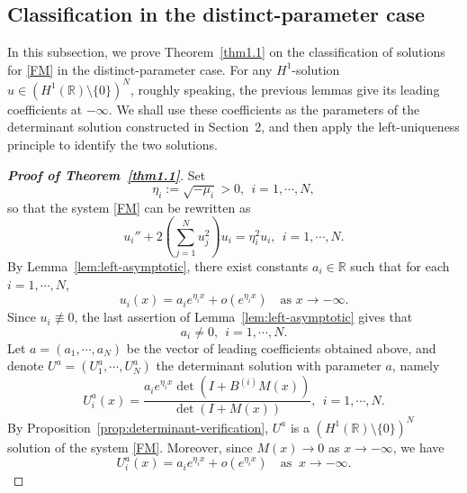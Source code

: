 \documentclass[11pt]{article}
\numberwithin{equation}{section}
\newcommand{\R}{{\mathbb{R}}}
\theoremstyle{definition}
\begin{document}
\subsection{Classification in the distinct-parameter case}
In this subsection, we prove   Theorem~\ref{thm1.1} on the classification of solutions for \eqref{FM} in the distinct-parameter case.  For any
\(H^1\)-solution \(u\in(H^1(\R)\setminus\{0\})^N\), roughly speaking, the previous lemmas give its leading coefficients at
\(-\infty\).  We shall use these coefficients as the parameters of the
determinant solution constructed in Section~2, and then apply the
left-uniqueness principle to identify the two solutions.


\begin{proof}[\normalfont\bfseries Proof of  Theorem~\ref{thm1.1}]
Set
\[
\eta_i:=\sqrt{-\mu_i}>0,
\ \  i=1,\cdots,N,
\]
so that the system \eqref{FM} can be rewritten as
\[
u_i''
+
2\left(\sum_{j=1}^N u_j^2\right)u_i
=
\eta_i^2u_i,
\ \  i=1,\cdots,N.
\]
By Lemma~\ref{lem:left-asymptotic}, there exist constants
\(a_i\in\mathbb R\) such that for each \(i=1,\cdots,N\),
\[
u_i(x)=a_i e^{\eta_i x}+o(e^{\eta_i x})\quad \text{as }x\to-\infty.
\]
Since \(u_i\not\equiv0\), the last assertion of
Lemma~\ref{lem:left-asymptotic} gives that
\[
a_i\neq0,\ \  i=1,\cdots,N.
\]
Let \(a=(a_1,\cdots,a_N)\) be the vector of leading coefficients obtained
above, and denote \(U^a=(U_1^a,\cdots,U_N^a)\)   the determinant solution
with parameter \(a\), namely
\[
U_i^a(x)
=
\frac{
	a_i e^{\eta_i x}\det(I+B^{(i)}M(x))
}{
	\det(I+M(x))
},
\ \  i=1,\cdots,N.
\]
By Proposition~\ref{prop:determinant-verification}, \(U^a\) is a
\((H^1(\mathbb R)\setminus\{0\})^N\) solution of the  system \eqref{FM}. Moreover, since
\(M(x)\to0\) as \(x\to-\infty\), we have
\[
U_i^a(x)=a_i e^{\eta_i x}+o(e^{\eta_i x})\quad \text{as }\ x\to-\infty.
\]


\end{proof}
\end{document}
